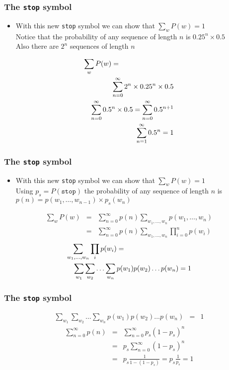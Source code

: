 \begin{frame}
\frametitle{The {\tt stop} symbol}
\begin{itemize}[<+->]
\item With this new {\tt stop} symbol we can show that $\sum_w P(w) = 1$ \\
Notice that the probability of any sequence of length $n$ is $0.25^n \times 0.5$ \\
Also there are $2^n$ sequences of length $n$
\end{itemize}
\begin{eqnarray}
\lefteqn{\sum_w P(w) = } \nonumber \\
&& \sum_{n=0}^{\infty} 2^n \times 0.25^n \times 0.5 \nonumber \\
&& \sum_{n=0}^{\infty} 0.5^n \times 0.5 = \sum_{n=0}^{\infty} 0.5^{n+1} \nonumber \\
&& \sum_{n=1}^{\infty} 0.5^n = 1 \nonumber
\end{eqnarray}
\end{frame}

\begin{frame}
\frametitle{The {\tt stop} symbol}
\begin{itemize}[<+->]
\item With this new {\tt stop} symbol we can show that $\sum_w P(w) = 1$ \\
Using $p_s = P(\texttt{stop})$ the probability of any sequence of length $n$ is $p(n) = p(w_1, \ldots, w_{n-1}) \times p_s(w_n)$ \\
\end{itemize}
\begin{eqnarray*}
\sum_w P(w) &=& \sum_{n=0}^{\infty} p(n) \sum_{w_1, \ldots, w_n} p(w_1, \ldots, w_n) \\
&=& \sum_{n=0}^{\infty} p(n) \sum_{w_1, \ldots, w_n} \prod_{i=0}^n p(w_i)
\end{eqnarray*}
\begin{eqnarray*}
\lefteqn{\sum_{w_1, \ldots, w_n} \prod_i p(w_i) = } \\
&& \sum_{w_1} \sum_{w_2} \ldots \sum_{w_n} p(w_1) p(w_2) \ldots p(w_n) = 1
\end{eqnarray*}
\end{frame}

\begin{frame}
\frametitle{The {\tt stop} symbol}
\begin{eqnarray*}
\sum_{w_1} \sum_{w_2} \ldots \sum_{w_n} p(w_1) p(w_2) \ldots p(w_n) &=& 1
\end{eqnarray*}
\begin{eqnarray*}
\sum_{n=0}^\infty p(n) &=& \sum_{n=0}^\infty p_s(1 - p_s)^n \\
&=& p_s \sum_{n=0}^\infty (1 - p_s)^n \\
&=& p_s \frac{1}{1-(1-p_s)} = p_s \frac{1}{p_s} = 1
\end{eqnarray*}
\end{frame}




 
